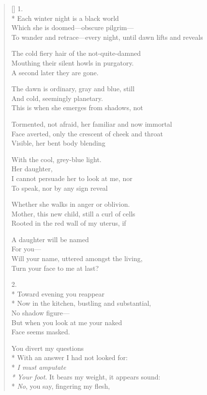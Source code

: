 \label{ch:threedreams}
\settowidth{\versewidth}{To wander and retrace---every night, until dawn lifts and reveals}
\begin{verse}[\versewidth]
1.\\*
Each winter night is a black world\\
Which she is doomed---obscure pilgrim---\\
To wander and retrace---every night, until dawn lifts and reveals

The cold fiery hair of the not-quite-damned\\
Mouthing their silent howls in purgatory.\\
\qquad A second later they are gone.

The dawn is ordinary, gray and blue, still\\
And cold, seemingly planetary.\\
This is when she emerges from shadows, not 

Tormented, not afraid, her familiar and now immortal\\
Face averted, only the crescent of cheek and throat\\
Visible, her bent body blending

With the cool, grey-blue light.\\
\hspace*{5\vgap} Her daughter,\\
I cannot persuade her to look at me, nor\\
To speak, nor by any sign reveal

Whether she walks in anger or oblivion.\\
Mother, this new child, still a curl of cells\\
Rooted in the red wall of my uterus, if

A daughter will be named\\
For you---\\
\hfill Will your name, uttered amongst the living,\\
Turn your face to me at last?

2.\\*
Toward evening you reappear\\*
Now in the kitchen, bustling and substantial,\\
No shadow figure---\\
But when you look at me your naked \\
Face seems masked.

You divert my questions\\*
With an answer I had not looked for:\\*
\textit{I must amputate \\*
Your foot}. It bears my weight, it appears sound:\\*
\textit{No}, you say, fingering my flesh,


\end{verse}

